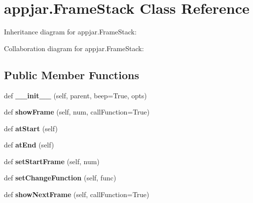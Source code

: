 \hypertarget{classappjar_1_1_frame_stack}{}\section{appjar.\+Frame\+Stack Class Reference}
\label{classappjar_1_1_frame_stack}


Inheritance diagram for appjar.\+Frame\+Stack\+:


Collaboration diagram for appjar.\+Frame\+Stack\+:
\subsection*{Public Member Functions}
\begin{DoxyCompactItemize}
\item 
\mbox{\label{classappjar_1_1_frame_stack_a9f5d2793f5a87b9e34ee27cdd7e4495f}} 
def {\bfseries \+\_\+\+\_\+init\+\_\+\+\_\+} (self, parent, beep=True, opts)
\item 
\mbox{\label{classappjar_1_1_frame_stack_a9860068826e1d9b08add5c3ecbbc17f2}} 
def {\bfseries show\+Frame} (self, num, call\+Function=True)
\item 
\mbox{\label{classappjar_1_1_frame_stack_af057ca4269b358f5cf349f733b9ee076}} 
def {\bfseries at\+Start} (self)
\item 
\mbox{\label{classappjar_1_1_frame_stack_abb7d67f123ad660e8af67fcf6356bdfe}} 
def {\bfseries at\+End} (self)
\item 
\mbox{\label{classappjar_1_1_frame_stack_abf2b7422dedcf05d1df1cae872fb7da5}} 
def {\bfseries set\+Start\+Frame} (self, num)
\item 
\mbox{\label{classappjar_1_1_frame_stack_aef4844bd85cefd618fcdf1d98b4c0052}} 
def {\bfseries set\+Change\+Function} (self, func)
\item 
\mbox{\label{classappjar_1_1_frame_stack_ae34b8388d103cc361981376de887f421}} 
def {\bfseries show\+Next\+Frame} (self, call\+Function=True)
\item 

\end{DoxyCompactItemize}
